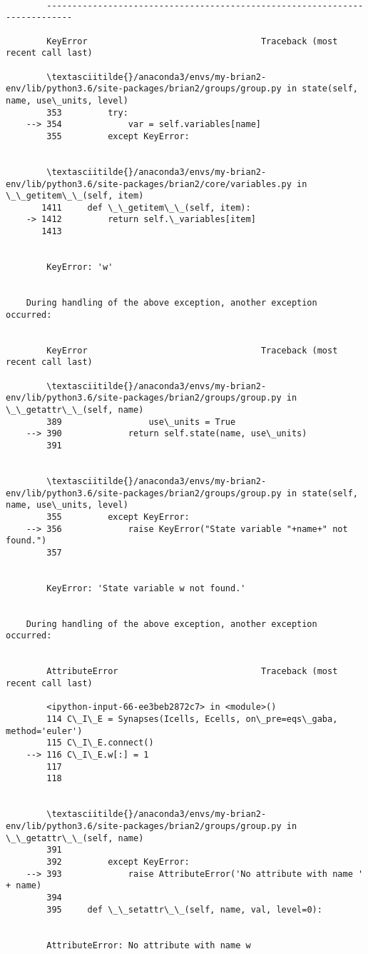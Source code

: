 \documentclass[11pt]{article}
\begin{document}
    \begin{Verbatim}[commandchars=\\\{\}]

        ---------------------------------------------------------------------------

        KeyError                                  Traceback (most recent call last)

        \textasciitilde{}/anaconda3/envs/my-brian2-env/lib/python3.6/site-packages/brian2/groups/group.py in state(self, name, use\_units, level)
        353         try:
    --> 354             var = self.variables[name]
        355         except KeyError:


        \textasciitilde{}/anaconda3/envs/my-brian2-env/lib/python3.6/site-packages/brian2/core/variables.py in \_\_getitem\_\_(self, item)
       1411     def \_\_getitem\_\_(self, item):
    -> 1412         return self.\_variables[item]
       1413 


        KeyError: 'w'

        
    During handling of the above exception, another exception occurred:


        KeyError                                  Traceback (most recent call last)

        \textasciitilde{}/anaconda3/envs/my-brian2-env/lib/python3.6/site-packages/brian2/groups/group.py in \_\_getattr\_\_(self, name)
        389                 use\_units = True
    --> 390             return self.state(name, use\_units)
        391 


        \textasciitilde{}/anaconda3/envs/my-brian2-env/lib/python3.6/site-packages/brian2/groups/group.py in state(self, name, use\_units, level)
        355         except KeyError:
    --> 356             raise KeyError("State variable "+name+" not found.")
        357 


        KeyError: 'State variable w not found.'

        
    During handling of the above exception, another exception occurred:


        AttributeError                            Traceback (most recent call last)

        <ipython-input-66-ee3beb2872c7> in <module>()
        114 C\_I\_E = Synapses(Icells, Ecells, on\_pre=eqs\_gaba, method='euler')
        115 C\_I\_E.connect()
    --> 116 C\_I\_E.w[:] = 1
        117 
        118 


        \textasciitilde{}/anaconda3/envs/my-brian2-env/lib/python3.6/site-packages/brian2/groups/group.py in \_\_getattr\_\_(self, name)
        391 
        392         except KeyError:
    --> 393             raise AttributeError('No attribute with name ' + name)
        394 
        395     def \_\_setattr\_\_(self, name, val, level=0):


        AttributeError: No attribute with name w

    \end{Verbatim}
\end{document}
